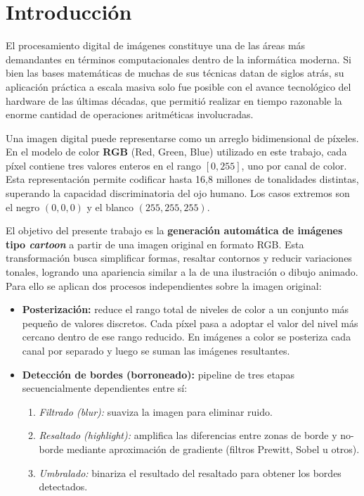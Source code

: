 \chapter{Introducción}
 
El procesamiento digital de imágenes constituye una de las áreas más demandantes en términos
computacionales dentro de la informática moderna. Si bien las bases matemáticas de muchas de
sus técnicas datan de siglos atrás, su aplicación práctica a escala masiva solo fue posible con
el avance tecnológico del hardware de las últimas décadas, que permitió realizar en tiempo
razonable la enorme cantidad de operaciones aritméticas involucradas.
 
Una imagen digital puede representarse como un arreglo bidimensional de píxeles. En el modelo
de color \textbf{RGB} (Red, Green, Blue) utilizado en este trabajo, cada píxel contiene tres
valores enteros en el rango $[0, 255]$, uno por canal de color. Esta representación permite
codificar hasta 16,8 millones de tonalidades distintas, superando la capacidad discriminatoria
del ojo humano. Los casos extremos son el negro $(0,0,0)$ y el blanco $(255,255,255)$.
 
El objetivo del presente trabajo es la \textbf{generación automática de imágenes tipo
\textit{cartoon}} a partir de una imagen original en formato RGB. Esta transformación busca
simplificar formas, resaltar contornos y reducir variaciones tonales, logrando una apariencia
similar a la de una ilustración o dibujo animado. Para ello se aplican dos procesos
independientes sobre la imagen original:
 
\begin{itemize}
  \item \textbf{Posterización:} reduce el rango total de niveles de color a un conjunto más
        pequeño de valores discretos. Cada píxel pasa a adoptar el valor del nivel más cercano
        dentro de ese rango reducido. En imágenes a color se posteriza cada canal por separado
        y luego se suman las imágenes resultantes.
 
  \item \textbf{Detección de bordes (borroneado):} pipeline de tres etapas secuencialmente
        dependientes entre sí:
        \begin{enumerate}
          \item \textit{Filtrado (blur):} suaviza la imagen para eliminar ruido.
          \item \textit{Resaltado (highlight):} amplifica las diferencias entre zonas de
                borde y no-borde mediante aproximación de gradiente (filtros Prewitt, Sobel
                u otros).
          \item \textit{Umbralado:} binariza el resultado del resaltado para obtener los
                bordes detectados.
        \end{enumerate}
\end{itemize}
 
